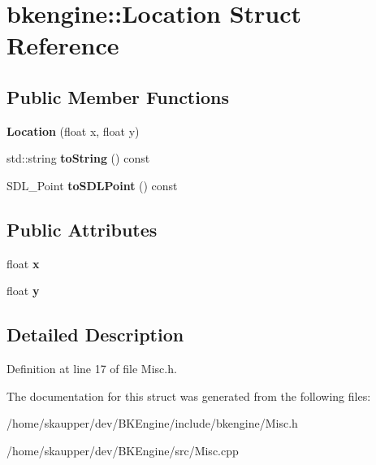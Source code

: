 \hypertarget{structbkengine_1_1Location}{}\section{bkengine\+:\+:Location Struct Reference}
\label{structbkengine_1_1Location}
\subsection*{Public Member Functions}
\begin{DoxyCompactItemize}
\item 
\mbox{\label{structbkengine_1_1Location_aea7a5db2f61c29e69784fe031fc896e3}} 
{\bfseries Location} (float x, float y)
\item 
\mbox{\label{structbkengine_1_1Location_a8acfe3b137ecc53b8c4f33197ab63511}} 
std\+::string {\bfseries to\+String} () const
\item 
\mbox{\label{structbkengine_1_1Location_a6df8ec3029d50231915aad247c645003}} 
S\+D\+L\+\_\+\+Point {\bfseries to\+S\+D\+L\+Point} () const
\end{DoxyCompactItemize}
\subsection*{Public Attributes}
\begin{DoxyCompactItemize}
\item 
\mbox{\label{structbkengine_1_1Location_a34ff117f0e3e95e644efbcfd54f46def}} 
float {\bfseries x}
\item 
\mbox{\label{structbkengine_1_1Location_ad7ee1cf61ddbac135229d2515e3f542e}} 
float {\bfseries y}
\end{DoxyCompactItemize}


\subsection{Detailed Description}


Definition at line 17 of file Misc.\+h.



The documentation for this struct was generated from the following files\+:\begin{DoxyCompactItemize}
\item 
/home/skaupper/dev/\+B\+K\+Engine/include/bkengine/Misc.\+h\item 
/home/skaupper/dev/\+B\+K\+Engine/src/Misc.\+cpp\end{DoxyCompactItemize}
